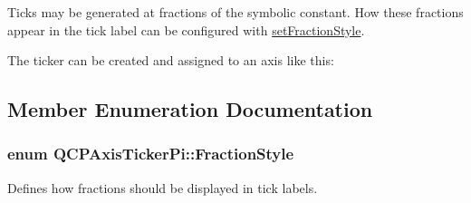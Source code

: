 Ticks may be generated at fractions of the symbolic constant. How these fractions appear in the tick label can be configured with \hyperlink{class_q_c_p_axis_ticker_pi_a760c8af6ca68178e607556c4e5049d71}{set\+Fraction\+Style}.

The ticker can be created and assigned to an axis like this\+: 
\begin{DoxyCodeInclude}
\end{DoxyCodeInclude}


\subsection{Member Enumeration Documentation}
\subsubsection[{\texorpdfstring{Fraction\+Style}{FractionStyle}}]{\setlength{\rightskip}{0pt plus 5cm}enum {\bf Q\+C\+P\+Axis\+Ticker\+Pi\+::\+Fraction\+Style}}\hypertarget{class_q_c_p_axis_ticker_pi_a262f1534c7f0c79a7d5237f5d1e2c54c}{}\label{class_q_c_p_axis_ticker_pi_a262f1534c7f0c79a7d5237f5d1e2c54c}
Defines how fractions should be displayed in tick labels.

